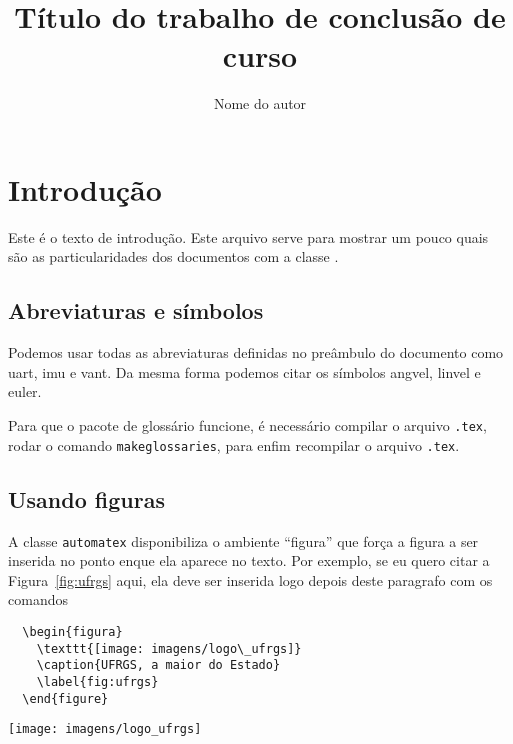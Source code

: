 \documentclass[portugues]{automatex}
\title{Título do trabalho de conclusão de curso}
\author{Nome do autor}
\begin{document}
\maketitle %

\section{Introdução}

Este é o texto de introdução. Este arquivo serve para mostrar um pouco quais são as particularidades dos documentos com a classe \automatex.

\subsection{Abreviaturas e símbolos}

Podemos usar todas as abreviaturas definidas no preâmbulo do documento como \gls{uart}, \gls{imu} e \gls{vant}. Da mesma forma podemos citar os símbolos \gls{angvel}, \gls{linvel} e \gls{euler}.

Para que o pacote de glossário funcione, é necessário compilar o arquivo \verb+.tex+, rodar o comando \verb+makeglossaries+, para enfim recompilar o arquivo \verb+.tex+.

\subsection{Usando figuras}

A classe \verb+automatex+ disponibiliza o ambiente ``figura'' que força a figura a ser inserida no ponto enque ela aparece no texto. Por exemplo, se eu quero citar a Figura~\ref{fig:ufrgs} aqui, ela deve ser inserida logo depois deste paragrafo com os comandos
\begin{verbatim}
  \begin{figura}
    \texttt{[image: imagens/logo\_ufrgs]}
    \caption{UFRGS, a maior do Estado}
    \label{fig:ufrgs}
  \end{figure}
\end{verbatim}

\begin{figura}
  \texttt{[image: imagens/logo\_ufrgs]}
  \caption{UFRGS, a maior do Estado}
  \label{fig:ufrgs}
\end{figura}
\end{document}
